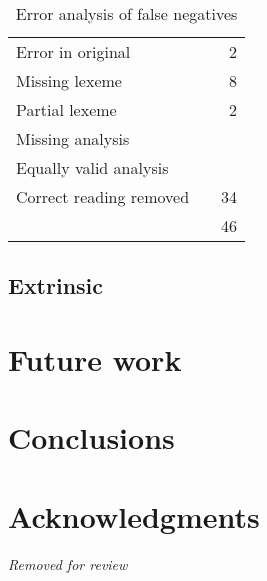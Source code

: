 \documentclass[11pt]{article}
\begin{document}
\begin{table}
  \centering
  \begin{tabular}{|l|r|r|}
    
    \hline
    Error in original        &   & 2 \\
    Missing lexeme           &   & 8  \\          %
    Partial lexeme           &   & 2  \\          %
    Missing analysis         &   &    \\        %
    Equally valid analysis   &   &    \\   %
    Correct reading removed  &   & 34   \\ %
    \hline
                             &   & 46 \\
    \hline
  \end{tabular}
  \caption{Error analysis of false negatives}
\end{table}






\subsection{Extrinsic}

\section{Future work}



\section{Conclusions}


\section*{Acknowledgments}
\textit{Removed for review}




\end{document}
